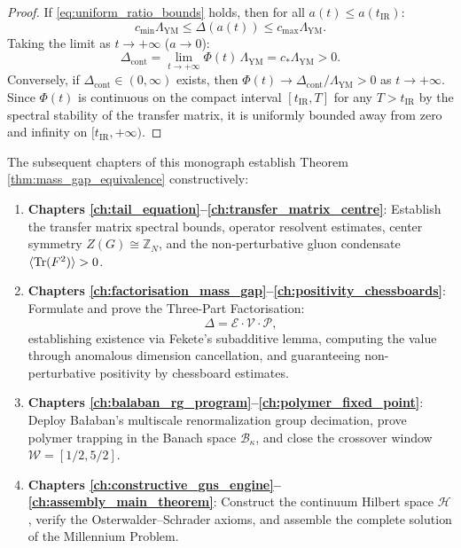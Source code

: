 \begin{proof}
If \eqref{eq:uniform_ratio_bounds} holds, then for all $a(t) \le a(t_{\mathrm{IR}})$:
\begin{equation}
c_{\min} \Lambda_{\mathrm{YM}} \le \Delta(a(t)) \le c_{\max} \Lambda_{\mathrm{YM}}.
\end{equation}
Taking the limit as $t \to +\infty$ ($a \to 0$):
\begin{equation}
\Delta_{\mathrm{cont}} = \lim_{t \to +\infty} \Phi(t) \, \Lambda_{\mathrm{YM}} = c_* \Lambda_{\mathrm{YM}} > 0.
\end{equation}
Conversely, if $\Delta_{\mathrm{cont}} \in (0, \infty)$ exists, then $\Phi(t) \to \Delta_{\mathrm{cont}} / \Lambda_{\mathrm{YM}} > 0$ as $t \to +\infty$. Since $\Phi(t)$ is continuous on the compact interval $[t_{\mathrm{IR}}, T]$ for any $T > t_{\mathrm{IR}}$ by the spectral stability of the transfer matrix, it is uniformly bounded away from zero and infinity on $[t_{\mathrm{IR}}, +\infty)$.
\end{proof}

The subsequent chapters of this monograph establish Theorem \ref{thm:mass_gap_equivalence} constructively:
\begin{enumerate}
    \item \textbf{Chapters \ref{ch:tail_equation}--\ref{ch:transfer_matrix_centre}}: Establish the transfer matrix spectral bounds, operator resolvent estimates, center symmetry $Z(G) \cong \mathbb{Z}_N$, and the non-perturbative gluon condensate $\langle \mathrm{Tr}(F^2) \rangle > 0$.
    \item \textbf{Chapters \ref{ch:factorisation_mass_gap}--\ref{ch:positivity_chessboards}}: Formulate and prove the Three-Part Factorisation:
    \begin{equation}
    \Delta = \mathcal{E} \cdot \mathcal{V} \cdot \mathcal{P},
    \end{equation}
    establishing existence via Fekete's subadditive lemma, computing the value through anomalous dimension cancellation, and guaranteeing non-perturbative positivity by chessboard estimates.
    \item \textbf{Chapters \ref{ch:balaban_rg_program}--\ref{ch:polymer_fixed_point}}: Deploy Bałaban's multiscale renormalization group decimation, prove polymer trapping in the Banach space $\mathcal{B}_\kappa$, and close the crossover window $\mathcal{W} = [1/2, 5/2]$.
    \item \textbf{Chapters \ref{ch:constructive_gns_engine}--\ref{ch:assembly_main_theorem}}: Construct the continuum Hilbert space $\mathcal{H}$, verify the Osterwalder--Schrader axioms, and assemble the complete solution of the Millennium Problem.
\end{enumerate}
